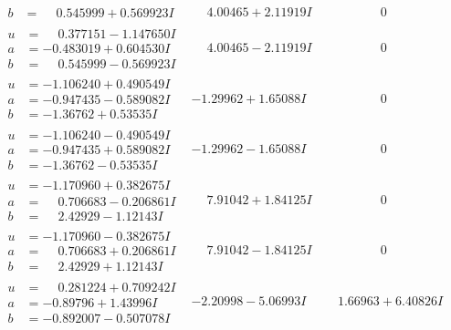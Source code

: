\documentclass[1p]{elsarticle_modified}
\theoremstyle{definition}
\begin{document}
$$\begin{array}{c|c|c}
\begin{aligned}
b &= \phantom{-}0.545999 + 0.569923 I\end{aligned}
 & \phantom{-}4.00465 + 2.11919 I & \phantom{-0.000000 } 0 \\ \hline\begin{aligned}
u &= \phantom{-}0.377151 - 1.147650 I \\
a &= -0.483019 + 0.604530 I \\
b &= \phantom{-}0.545999 - 0.569923 I\end{aligned}
 & \phantom{-}4.00465 - 2.11919 I & \phantom{-0.000000 } 0 \\ \hline\begin{aligned}
u &= -1.106240 + 0.490549 I \\
a &= -0.947435 - 0.589082 I \\
b &= -1.36762 + 0.53535 I\end{aligned}
 & -1.29962 + 1.65088 I & \phantom{-0.000000 } 0 \\ \hline\begin{aligned}
u &= -1.106240 - 0.490549 I \\
a &= -0.947435 + 0.589082 I \\
b &= -1.36762 - 0.53535 I\end{aligned}
 & -1.29962 - 1.65088 I & \phantom{-0.000000 } 0 \\ \hline\begin{aligned}
u &= -1.170960 + 0.382675 I \\
a &= \phantom{-}0.706683 - 0.206861 I \\
b &= \phantom{-}2.42929 - 1.12143 I\end{aligned}
 & \phantom{-}7.91042 + 1.84125 I & \phantom{-0.000000 } 0 \\ \hline\begin{aligned}
u &= -1.170960 - 0.382675 I \\
a &= \phantom{-}0.706683 + 0.206861 I \\
b &= \phantom{-}2.42929 + 1.12143 I\end{aligned}
 & \phantom{-}7.91042 - 1.84125 I & \phantom{-0.000000 } 0 \\ \hline\begin{aligned}
u &= \phantom{-}0.281224 + 0.709242 I \\
a &= -0.89796 + 1.43996 I \\
b &= -0.892007 - 0.507078 I\end{aligned}
 & -2.20998 - 5.06993 I & \phantom{-}1.66963 + 6.40826 I \\ \hline\begin{aligned}

\end{aligned}
\end{array}$$
\end{document}
